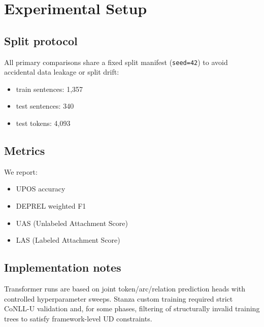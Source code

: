 \section{Experimental Setup}



\subsection{Split protocol}



All primary comparisons share a fixed split manifest (\texttt{seed=42}) to avoid accidental data leakage or split drift:

\begin{itemize}[leftmargin=1.25em]

  \item train sentences: 1,357

  \item test sentences: 340

  \item test tokens: 4,093

\end{itemize}



\subsection{Metrics}



We report:

\begin{itemize}[leftmargin=1.25em]

  \item UPOS accuracy

  \item DEPREL weighted F1

  \item UAS (Unlabeled Attachment Score)

  \item LAS (Labeled Attachment Score)

\end{itemize}



\subsection{Implementation notes}



Transformer runs are based on joint token/arc/relation prediction heads with controlled hyperparameter sweeps. Stanza custom training required strict CoNLL-U validation and, for some phases, filtering of structurally invalid training trees to satisfy framework-level UD constraints.



